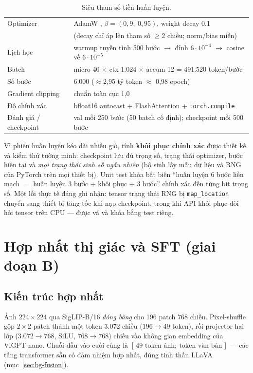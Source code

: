\begin{table}[H]
	\centering
	\caption{Siêu tham số tiền huấn luyện.}
	\label{tab:pretrain-hp}
	\begin{tabular}{ll}
		\hline
		Optimizer & AdamW \autocite{loshchilov2019adamw}, $\beta = (0{,}9;\ 0{,}95)$, weight decay 0,1 \\
		 & (decay chỉ áp lên tham số $\ge$2 chiều; norm/bias miễn) \\
		Lịch học & warmup tuyến tính 500 bước $\to$ đỉnh $6 \cdot 10^{-4}$ $\to$ cosine về $6 \cdot 10^{-5}$ \\
		Batch & micro 40 $\times$ ctx 1.024 $\times$ accum 12 = 491.520 token/bước \\
		Số bước & 6.000 ($\approx$2,95 tỷ token $\approx$ 0,98 epoch) \\
		Gradient clipping & chuẩn toàn cục 1,0 \\
		Độ chính xác & bfloat16 autocast + FlashAttention + \texttt{torch.compile} \\
		Đánh giá / checkpoint & val mỗi 250 bước (50 batch cố định); checkpoint mỗi 500 bước \\
		\hline
	\end{tabular}
\end{table}

Vì phiên huấn luyện kéo dài nhiều giờ, tính \textbf{khôi phục chính xác} được
thiết kế và kiểm thử tường minh: checkpoint lưu đủ trọng số, trạng thái
optimizer, bước hiện tại và \emph{mọi trạng thái sinh số ngẫu nhiên} (bộ sinh
lấy mẫu dữ liệu và RNG của PyTorch trên mọi thiết bị). Unit test khóa bất biến
``huấn luyện 6 bước liền mạch $=$ huấn luyện 3 bước + khôi phục + 3 bước''
chính xác đến từng bit trọng số. Một lỗi thực tế đáng ghi nhận: tensor trạng
thái RNG bị \texttt{map\_location} chuyển sang thiết bị tăng tốc khi nạp
checkpoint, trong khi API khôi phục đòi hỏi tensor trên CPU --- được vá và
khóa bằng test riêng.

\section{Hợp nhất thị giác và SFT (giai đoạn B)}
\label{sec:met-fusion}

\subsection{Kiến trúc hợp nhất}

Ảnh $224 \times 224$ qua SigLIP-B/16 \emph{đóng băng} cho 196 patch 768
chiều. Pixel-shuffle gộp $2 \times 2$ patch thành một token 3.072 chiều
($196 \to 49$ token), rồi projector hai lớp
($3.072 \to 768$, SiLU, $768 \to 768$) chiếu vào không gian embedding của
ViGPT-nano. Chuỗi đầu vào cuối cùng là
$[\,49 \text{ token ảnh};\ \text{token văn bản}\,]$ --- các tầng transformer
sẵn có đảm nhiệm hợp nhất, đúng tinh thần LLaVA (mục~\ref{sec:bg-fusion}).

